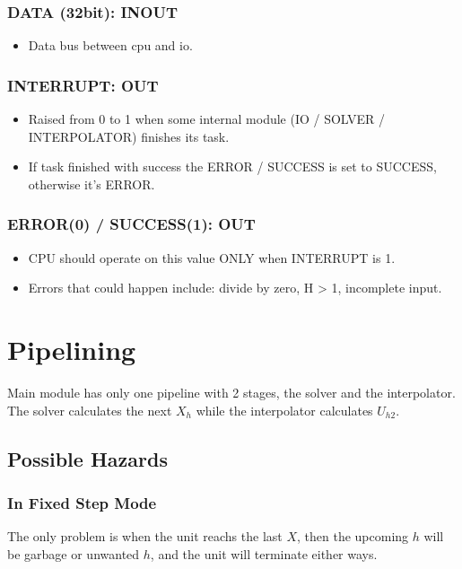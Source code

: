 \documentclass[12pt]{report}
\begin{document}
\subsubsection{DATA (32bit): INOUT}
\begin{itemize}
    \item Data bus between cpu and io.
\end{itemize}

\subsubsection{INTERRUPT: OUT}
\begin{itemize}
    \item Raised from 0 to 1 when some internal module (IO / SOLVER / INTERPOLATOR) finishes its task.
    \item If task finished with success the {ERROR / SUCCESS} is set to {SUCCESS}, otherwise it's {ERROR}.
\end{itemize}

\subsubsection{ERROR(0) / SUCCESS(1): OUT}
\begin{itemize}
    \item CPU should operate on this value ONLY when {INTERRUPT} is 1.
    \item Errors that could happen include: divide by zero, H > 1, incomplete input.
\end{itemize}

\section{Pipelining} 
\label{sec:pipeline}
Main module has only one pipeline with 2 stages, the solver and the interpolator.
The solver calculates the next $X_h$ while the interpolator calculates $U_{h2}$.

\subsection{Possible Hazards}
\subsubsection{In Fixed Step Mode} 
The only problem is when the unit reachs the last $X$, then the upcoming $h$ will be garbage or unwanted $h$, and the unit will terminate either ways.
\end{document}
